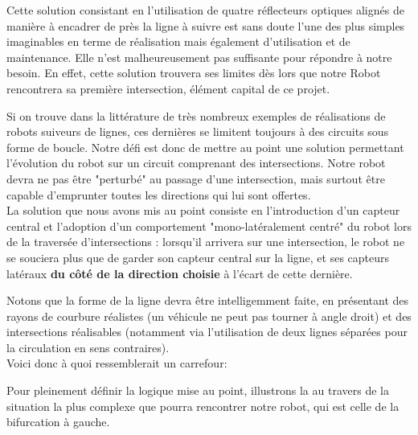 		Cette solution consistant en l'utilisation de quatre réflecteurs optiques alignés de manière à encadrer de près la ligne à suivre est sans doute l'une des plus simples imaginables en terme de réalisation mais également d'utilisation et de maintenance.
		Elle n'est malheureusement pas suffisante pour répondre à notre besoin. En effet, cette solution trouvera ses limites dès lors que notre Robot rencontrera sa première intersection, élément capital de ce projet.\\


		Si on trouve dans la littérature de très nombreux exemples de réalisations de robots suiveurs de lignes, ces dernières se limitent toujours à des circuits sous forme de boucle. Notre défi est donc de mettre au point une solution permettant l'évolution du robot sur un circuit comprenant des intersections. Notre robot devra ne pas être "perturbé" au passage d'une intersection, mais surtout être capable d'emprunter toutes les directions qui lui sont offertes.\\

		La solution que nous avons mis au point consiste en l'introduction d'un capteur central et l'adoption d'un comportement "mono-latéralement centré" du robot lors de la traversée d'intersections : lorsqu'il arrivera sur une intersection, le robot ne se souciera plus que de garder son capteur central sur la ligne, et ses capteurs latéraux \textbf{du côté de la direction choisie} à l'écart de cette dernière.


		Notons que la forme de la ligne devra être intelligemment faite, en présentant des rayons de courbure réalistes (un véhicule ne peut pas tourner à angle droit) et des intersections réalisables (notamment via l'utilisation de deux lignes séparées pour la circulation en sens contraires).\\

		Voici donc à quoi ressemblerait un carrefour:

		Pour pleinement définir la logique mise au point, illustrons la au travers de la situation la plus complexe que pourra rencontrer notre robot, qui est celle de la bifurcation à gauche.


